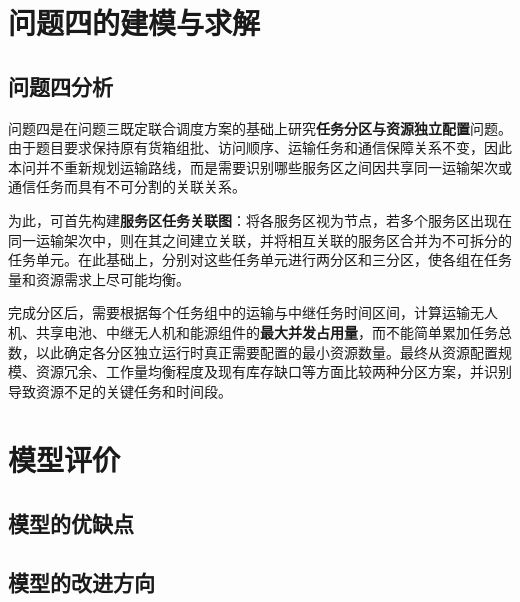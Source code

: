 \documentclass[bwprint,fontset=fandol]{gmcmthesis}
\begin{document}
\section{问题四的建模与求解}
\subsection{问题四分析}
问题四是在问题三既定联合调度方案的基础上研究\textbf{任务分区与资源独立配置}问题。由于题目要求保持原有货箱组批、访问顺序、运输任务和通信保障关系不变，因此本问并不重新规划运输路线，而是需要识别哪些服务区之间因共享同一运输架次或通信任务而具有不可分割的关联关系。

为此，可首先构建\textbf{服务区任务关联图}：将各服务区视为节点，若多个服务区出现在同一运输架次中，则在其之间建立关联，并将相互关联的服务区合并为不可拆分的任务单元。在此基础上，分别对这些任务单元进行两分区和三分区，使各组在任务量和资源需求上尽可能均衡。

完成分区后，需要根据每个任务组中的运输与中继任务时间区间，计算运输无人机、共享电池、中继无人机和能源组件的\textbf{最大并发占用量}，而不能简单累加任务总数，以此确定各分区独立运行时真正需要配置的最小资源数量。最终从资源配置规模、资源冗余、工作量均衡程度及现有库存缺口等方面比较两种分区方案，并识别导致资源不足的关键任务和时间段。

\section{模型评价}
\subsection{模型的优缺点}
\subsection{模型的改进方向}



\cite{mittelbach_latex_2004,wright_latex3_2009,beeton_unicode_2008,vieth_experiences_2009}



\end{document}
